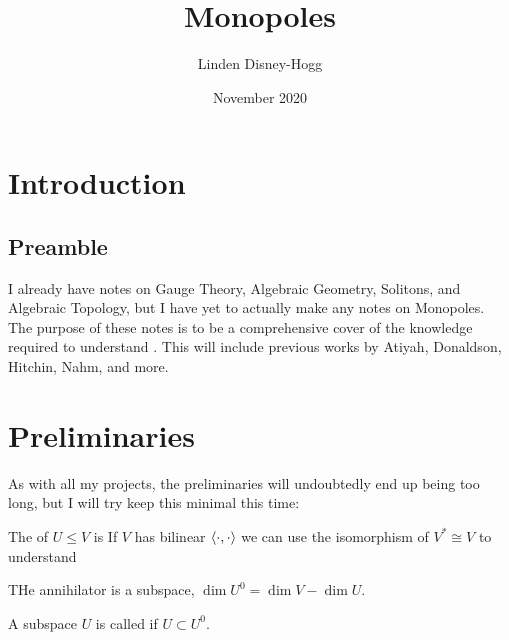 \documentclass{article}
\title{Monopoles}
\author{Linden Disney-Hogg}
\date{November 2020}
\begin{document}
\maketitle
\tableofcontents

\section{Introduction}
\subsection{Preamble}
I already have notes on Gauge Theory, Algebraic Geometry, Solitons, and Algebraic Topology, but I have yet to actually make any notes on Monopoles. The purpose of these notes is to be a comprehensive cover of the knowledge required to understand \cite{Braden2018}. This will include previous works by Atiyah, Donaldson, Hitchin, Nahm, and more.
\section{Preliminaries}
As with all my projects, the preliminaries will undoubtedly end up being too long, but I will try keep this minimal this time: 
\begin{definition}
	The  of $U \leq V$ is 
If $V$ has bilinear $\left\langle \cdot, \cdot \right\rangle$ we can use the isomorphism of $V^\ast\cong V$ to understand 
\end{definition}

\begin{lemma}
	THe annihilator is a subspace, $\dim U^0 = \dim V  - \dim U$. 
\end{lemma}

\begin{definition}
	A subspace $U$ is called  if $U \subset U^0$. 
\end{definition}
\end{document}
